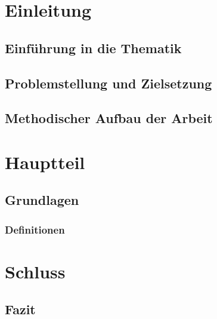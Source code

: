 \section{Einleitung}
\subsection{Einführung in die Thematik}

\subsection{Problemstellung und Zielsetzung}
\blindtext
\blindtext

\subsection{Methodischer Aufbau der Arbeit}
\blindtext

\section{Hauptteil}
\subsection{Grundlagen}
\blindtext
\blindenumerate
\Blindtext
\blinddescription
\blindtext

\subsubsection{Definitionen}
\blindtext
\blinditemize
\Blindtext

\section{Schluss}
\subsection{Fazit}
\Blindtext
